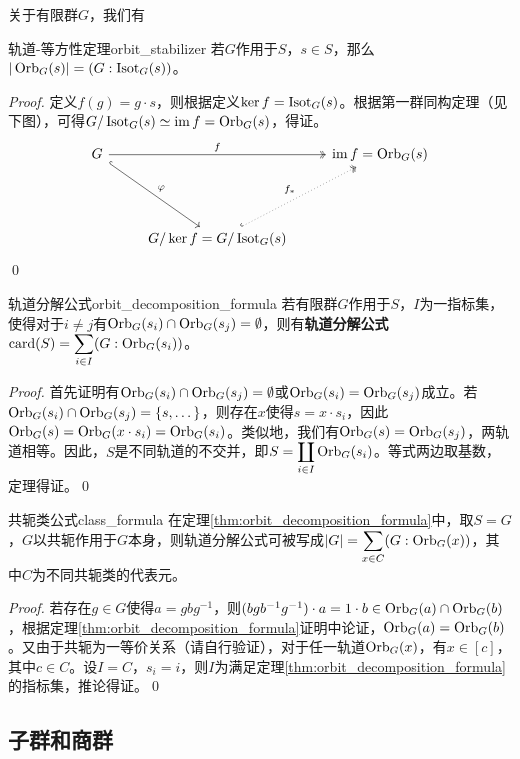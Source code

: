 \documentclass[../main.tex]{subfiles}
\begin{document}
关于有限群$G$，我们有
\begin{proposition}{轨道-等方性定理}{orbit_stabilizer}
若$G$作用于$S$，$s\in S$，那么$|\operatorname{Orb}_G(s)|=(G:\operatorname{Isot}_G(s))$。
\end{proposition}
\begin{proof}
定义$f(g)=g\cdot s$，则根据定义$\ker f=\operatorname{Isot}_G(s)$。根据第一群同构定理（见下图），可得$G/\operatorname{Isot}_G(s)\simeq\operatorname{im} f=\operatorname{Orb}_G(s)$，得证。
$$\begin{tikzcd}
G \arrow[rdd, "\varphi", hook] \arrow[rr, "f", two heads] & {} & \im f=\orbit_G(s) \\ {} & {} & {}\\ {} & G/\ker f=G/\isotropy_G(s) \arrow[ruu, "f_*", two heads, dotted, hook] & {}
\end{tikzcd}$$
\qed
\end{proof}
\begin{theorem}{轨道分解公式}{orbit_decomposition_formula}
若有限群$G$作用于$S$，$I$为一指标集，使得对于$i\neq j$有$\operatorname{Orb}_G(s_i)\cap\operatorname{Orb}_G(s_j)=\emptyset$，则有\textbf{轨道分解公式}$\displaystyle\operatorname{card}(S)=\sum_{i\in I}(G:\operatorname{Orb}_G(s_i))$。
\end{theorem}
\begin{proof}
首先证明有$\operatorname{Orb}_G(s_i)\cap\operatorname{Orb}_G(s_j)=\emptyset$或$\operatorname{Orb}_G(s_i)=\operatorname{Orb}_G(s_j)$成立。若$\operatorname{Orb}_G(s_i)\cap\operatorname{Orb}_G(s_j)=\{s,\dots\}$，则存在$x$使得$s=x\cdot s_i$，因此$\operatorname{Orb}_G(s)=\operatorname{Orb}_G(x\cdot s_i)=\operatorname{Orb}_G(s_i)$。类似地，我们有$\operatorname{Orb}_G(s)=\operatorname{Orb}_G(s_j)$，两轨道相等。因此，$S$是不同轨道的不交并，即$\displaystyle S=\coprod_{i\in I}\operatorname{Orb}_G(s_i)$。等式两边取基数，定理得证。\qed
\end{proof}
\begin{corollary}{共轭类公式}{class_formula}
在定理\ref{thm:orbit_decomposition_formula}中，取$S=G$，$G$以共轭作用于$G$本身，则轨道分解公式可被写成$\displaystyle|G|=\sum_{x\in C}(G:\operatorname{Orb}_G(x))$，其中$C$为不同共轭类的代表元。
\end{corollary}
\begin{proof}
若存在$g\in G$使得$a=gbg^{-1}$，则$(bgb^{-1}g^{-1})\cdot a=1\cdot b\in\operatorname{Orb}_G(a)\cap\operatorname{Orb}_G(b)$，根据定理\ref{thm:orbit_decomposition_formula}证明中论证，$\operatorname{Orb}_G(a)=\operatorname{Orb}_G(b)$。又由于共轭为一等价关系（请自行验证），对于任一轨道$\operatorname{Orb}_G(x)$，有$x\in[c]$，其中$c\in C$。设$I=C$，$s_i=i$，则$I$为满足定理\ref{thm:orbit_decomposition_formula}的指标集，推论得证。\qed
\end{proof}
\subsection{子群和商群}
\end{document}
